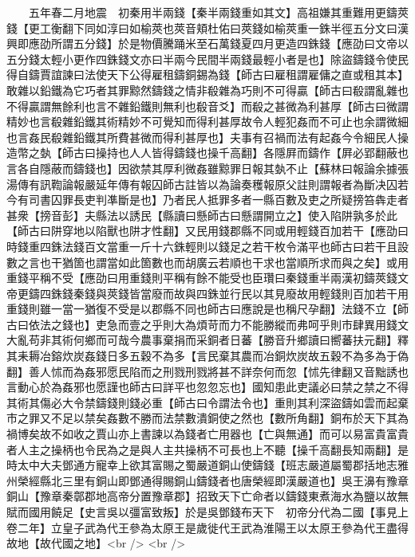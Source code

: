 　　五年春二月地震　初秦用半兩錢【秦半兩錢重如其文】高祖嫌其重難用更鑄莢錢【更工衡翻下同如淳曰如榆莢也莢音頬杜佑曰莢錢如榆莢重一銖半徑五分文曰漢興即應劭所謂五分錢】於是物價騰踊米至石萬錢夏四月更造四銖錢【應劭曰文帝以五分錢太輕小更作四銖錢文亦曰半兩今民間半兩錢最輕小者是也】除盜鑄錢令使民得自鑄賈誼諫曰法使天下公得雇租鑄銅錫為錢【師古曰雇租謂雇傭之直或租其本】敢雜以鉛鐵為它巧者其罪黥然鑄錢之情非殽雜為巧則不可得贏【師古曰殽謂亂雜也不得贏謂無餘利也言不雜鉛鐵則無利也殽音爻】而殽之甚微為利甚厚【師古曰微謂精妙也言殽雜鉛鐵其術精妙不可覺知而得利甚厚故令人輕犯姦而不可止也余謂微細也言姦民殽雜鉛鐵其所費甚微而得利甚厚也】夫事有召禍而法有起姦今令細民人操造幣之埶【師古曰操持也人人皆得鑄錢也操千高翻】各隱屛而鑄作【屛必郢翻蔽也言各自隱蔽而鑄錢也】因欲禁其厚利微姦雖黥罪日報其埶不止【蘇林曰報論余據張湯傳有訊鞫論報嚴延年傳有報囚師古註皆以為論奏穫報原父註則謂報者為斷决囚若今有司書囚罪長吏判凖斷是也】乃者民人抵罪多者一縣百數及吏之所疑搒笞犇走者甚衆【搒音彭】夫縣法以誘民【縣讀曰懸師古曰懸謂開立之】使入陷阱孰多於此【師古曰阱穿地以陷獸也阱才性翻】又民用錢郡縣不同或用輕錢百加若干【應劭曰時錢重四銖法錢百文當重一斤十六銖輕則以錢足之若干枚令滿平也師古曰若干且設數之言也干猶箇也謂當如此箇數也而胡廣云若順也干求也當順所求而與之矣】或用重錢平稱不受【應劭曰用重錢則平稱有餘不能受也臣瓚曰秦錢重半兩漢初鑄莢錢文帝更鑄四銖錢秦錢與莢錢皆當廢而故與四銖並行民以其見廢故用輕錢則百加若干用重錢則雖一當一猶復不受是以郡縣不同也師古曰應說是也稱尺孕翻】法錢不立【師古曰依法之錢也】吏急而壹之乎則大為煩苛而力不能勝縱而弗呵乎則市肆異用錢文大亂苟非其術何鄉而可哉今農事棄捐而采銅者日蕃【勝音升鄉讀曰嚮蕃扶元翻】釋其耒耨冶鎔炊炭姦錢日多五穀不為多【言民棄其農而冶銅炊炭故五穀不為多為于偽翻】善人怵而為姦邪愿民陷而之刑戮刑戮將甚不詳奈何而忽【怵先律翻又音黜誘也言動心於為姦邪也愿謹也師古曰詳平也忽忽忘也】國知患此吏議必曰禁之禁之不得其術其傷必大令禁鑄錢則錢必重【師古曰令謂法令也】重則其利深盜鑄如雲而起棄市之罪又不足以禁矣姦數不勝而法禁數潰銅使之然也【數所角翻】銅布於天下其為禍博矣故不如收之賈山亦上書諫以為錢者亡用器也【亡與無通】而可以易富貴富貴者人主之操柄也令民為之是與人主共操柄不可長也上不聽【操千高翻長知兩翻】是時太中大夫鄧通方寵幸上欲其富賜之蜀嚴道銅山使鑄錢【班志嚴道屬蜀郡括地志雅州榮經縣北三里有銅山即鄧通得賜銅山鑄錢者也唐榮經即漢嚴道也】吳王濞有豫章銅山【豫章秦鄣郡地高帝分置豫章郡】招致天下亡命者以鑄錢東煮海水為鹽以故無賦而國用饒足【史言吳以彊富致叛】於是吳鄧錢布天下　初帝分代為二國【事見上卷二年】立皇子武為代王參為太原王是歲徙代王武為淮陽王以太原王參為代王盡得故地【故代國之地】<br />
<br />
